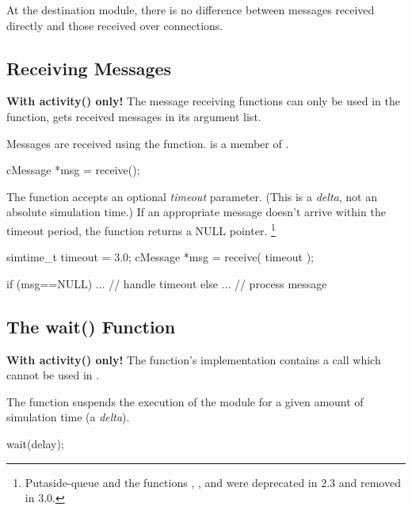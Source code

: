 At the destination module, there is no difference between messages received
directly and those received over connections.



\subsection{Receiving Messages}
\label{sec:simple-modules:receiving-messages}

\textbf{With activity() only!} The message receiving functions can
only be used in the  function,
 gets received messages in its argument list.

Messages are received using the  function.
 is a member of .

\begin{cpp}
cMessage *msg = receive();
\end{cpp}

The  function accepts an optional \textit{timeout}
parameter. (This is a \textit{delta}, not an
absolute simulation time.) If an appropriate message doesn't arrive
within the timeout period, the function returns a NULL pointer.
    \footnote{Putaside-queue and the functions ,
    , and  were deprecated
    in {\opp} 2.3 and removed in {\opp} 3.0.}

\begin{cpp}
simtime_t timeout = 3.0;
cMessage *msg = receive( timeout );

if (msg==NULL)
{
    ...   // handle timeout
}
else
{
    ...  // process message
}
\end{cpp}



\subsection{The wait() Function}
\label{sec:simple-modules:wait}

\textbf{With activity() only!} The  function's implementation
contains a  call which cannot be used in .

The  function suspends the execution of the module for
a given amount of simulation time (a \textit{delta}).

\begin{cpp}
wait(delay);
\end{cpp}

